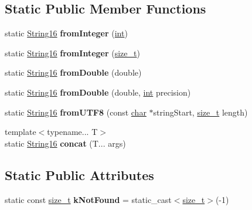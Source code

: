 \subsection*{Static Public Member Functions}
\begin{DoxyCompactItemize}
\item 
\mbox{\label{classv8__inspector_1_1String16_a3e664239410a5b580b79035d574d4ae3}} 
static \mbox{\hyperlink{classv8__inspector_1_1String16}{String16}} {\bfseries from\+Integer} (\mbox{\hyperlink{classint}{int}})
\item 
\mbox{\label{classv8__inspector_1_1String16_a4fc20e66a7339e6b936c1c5bf0ad70e4}} 
static \mbox{\hyperlink{classv8__inspector_1_1String16}{String16}} {\bfseries from\+Integer} (\mbox{\hyperlink{classsize__t}{size\+\_\+t}})
\item 
\mbox{\label{classv8__inspector_1_1String16_a5d752b6497239d27527a3aae2fd666ec}} 
static \mbox{\hyperlink{classv8__inspector_1_1String16}{String16}} {\bfseries from\+Double} (double)
\item 
\mbox{\label{classv8__inspector_1_1String16_a0789dcd06ca2fb2c15941b6bf5e934c3}} 
static \mbox{\hyperlink{classv8__inspector_1_1String16}{String16}} {\bfseries from\+Double} (double, \mbox{\hyperlink{classint}{int}} precision)
\item 
\mbox{\label{classv8__inspector_1_1String16_a0f9b532b278d874599932185bde29caa}} 
static \mbox{\hyperlink{classv8__inspector_1_1String16}{String16}} {\bfseries from\+U\+T\+F8} (const \mbox{\hyperlink{classchar}{char}} $\ast$string\+Start, \mbox{\hyperlink{classsize__t}{size\+\_\+t}} length)
\item 
\mbox{\label{classv8__inspector_1_1String16_a5151ece8e5ff475551c37b39e550102c}} 
{\footnotesize template$<$typename... T$>$ }\\static \mbox{\hyperlink{classv8__inspector_1_1String16}{String16}} {\bfseries concat} (T... args)
\end{DoxyCompactItemize}
\subsection*{Static Public Attributes}
\begin{DoxyCompactItemize}
\item 
\mbox{\label{classv8__inspector_1_1String16_ad2ff01e5e03f69840076a635aeec44b8}} 
static const \mbox{\hyperlink{classsize__t}{size\+\_\+t}} {\bfseries k\+Not\+Found} = static\+\_\+cast$<$\mbox{\hyperlink{classsize__t}{size\+\_\+t}}$>$(-\/1)
\end{DoxyCompactItemize}


